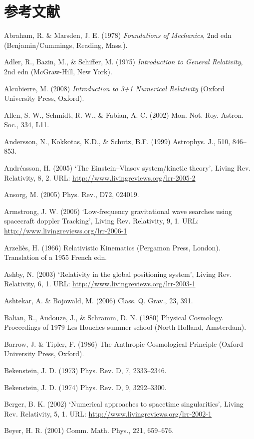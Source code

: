 \chapter*{参考文献}
{
Abraham, R. \& Marsden, J. E. (1978) \textit{Foundations of Mechanics}, 2nd edn (Benjamin/Cummings, Reading, Mass.).

Adler, R., Bazin, M., \& Schiffer, M. (1975) \textit{Introduction to General Relativity}, 2nd edn
(McGraw-Hill, New York).

Alcubierre, M. (2008) \textit{Introduction to 3+1 Numerical Relativity} (Oxford University Press,
Oxford).

Allen, S. W., Schmidt, R. W., \& Fabian, A. C. (2002) Mon. Not. Roy. Astron. Soc., 334, L11.

Andersson, N., Kokkotas, K.D., \& Schutz, B.F. (1999) Astrophys. J., 510, 846–853.

Andréasson, H. (2005) ‘The Einstein–Vlasov system/kinetic 
theory’, Living Rev. Relativity, 8, 2. URL: \url{http://www.livingreviews.org/lrr-2005-2}

Ansorg, M. (2005) Phys. Rev., D72, 024019.

Armstrong, J. W. (2006) ‘Low-frequency gravitational wave searches using spacecraft doppler Tracking’, Living Rev. Relativity, 9, 1. URL: \url{http://www.livingreviews.org/lrr-2006-1}


Arzeliès, H. (1966) Relativistic Kinematics (Pergamon Press, London). Translation of a 1955 French edn.


Ashby, N. (2003) ‘Relativity in the global positioning system’, Living Rev. Relativity, 6, 1.
URL: \url{http://www.livingreviews.org/lrr-2003-1}


Ashtekar, A. \& Bojowald, M. (2006) Class. Q. Grav., 23, 391.


Balian, R., Audouze, J., \& Schramm, D. N. (1980) Physical Cosmology. Proceedings of 1979 Les Houches summer school (North-Holland, Amsterdam).


Barrow, J. \& Tipler, F. (1986) The Anthropic Cosmological Principle (Oxford University Press, Oxford).


Bekenstein, J. D. (1973) Phys. Rev. D, 7, 2333–2346.


Bekenstein, J. D. (1974) Phys. Rev. D, 9, 3292–3300.


Berger, B. K. (2002) ‘Numerical approaches to spacetime singularities’, Living Rev. Relativity, 5, 1. URL: \url{http://www.livingreviews.org/lrr-2002-1}


Beyer, H. R. (2001) Comm. Math. Phys., 221, 659–676.


}
